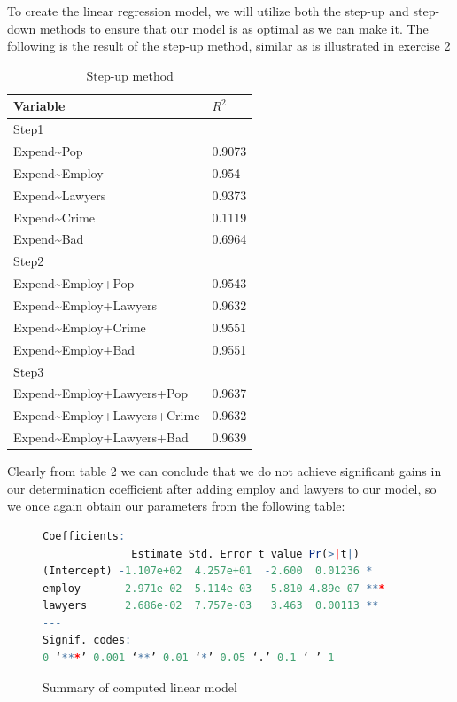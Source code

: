 \documentclass{article}
\begin{document}
    To create the linear regression model, we will utilize both the step-up and step-down methods to ensure that our model is as optimal as we can make it.
    The following is the result of the step-up method, similar as is illustrated in exercise 2
    \begin{table}[H]
    \begin{center}
    \begin{tabular}{|ll|}
        \hline
        Variable & $R^2$ \\
        \hline 
        Step1&\\
        \hline
        Expend\textasciitilde Pop & 0.9073 \\
        Expend\textasciitilde Employ & 0.954 \\
        Expend\textasciitilde Lawyers & 0.9373 \\
        Expend\textasciitilde Crime & 0.1119 \\
        Expend\textasciitilde Bad & 0.6964 \\
        \hline
        Step2&\\
        \hline 
        Expend\textasciitilde Employ+Pop & 0.9543 \\
        Expend\textasciitilde Employ+Lawyers & 0.9632 \\
        Expend\textasciitilde Employ+Crime & 0.9551 \\
        Expend\textasciitilde Employ+Bad & 0.9551 \\
        \hline
        Step3&\\
        \hline 
        Expend\textasciitilde Employ+Lawyers+Pop & 0.9637 \\
        Expend\textasciitilde Employ+Lawyers+Crime & 0.9632 \\
        Expend\textasciitilde Employ+Lawyers+Bad & 0.9639 \\
        \hline
    \end{tabular}
    \caption{Step-up method}
    \label{table:step-up}
    \end{center}
    \end{table}
    
    Clearly from table 2 we can conclude that we do not achieve significant gains in our determination coefficient after adding employ and lawyers to our model, so we once again obtain our parameters from the following table:
    
\begin{figure}[H]
	\begin{lstlisting}[language=R]
Coefficients:
              Estimate Std. Error t value Pr(>|t|)    
(Intercept) -1.107e+02  4.257e+01  -2.600  0.01236 *  
employ       2.971e-02  5.114e-03   5.810 4.89e-07 ***
lawyers      2.686e-02  7.757e-03   3.463  0.00113 ** 
---
Signif. codes:  
0 ‘***’ 0.001 ‘**’ 0.01 ‘*’ 0.05 ‘.’ 0.1 ‘ ’ 1
    \end{lstlisting}
    \caption{Summary of computed linear model}
    \label{table:fourstepup}
    \end{figure}
    
\end{document}
